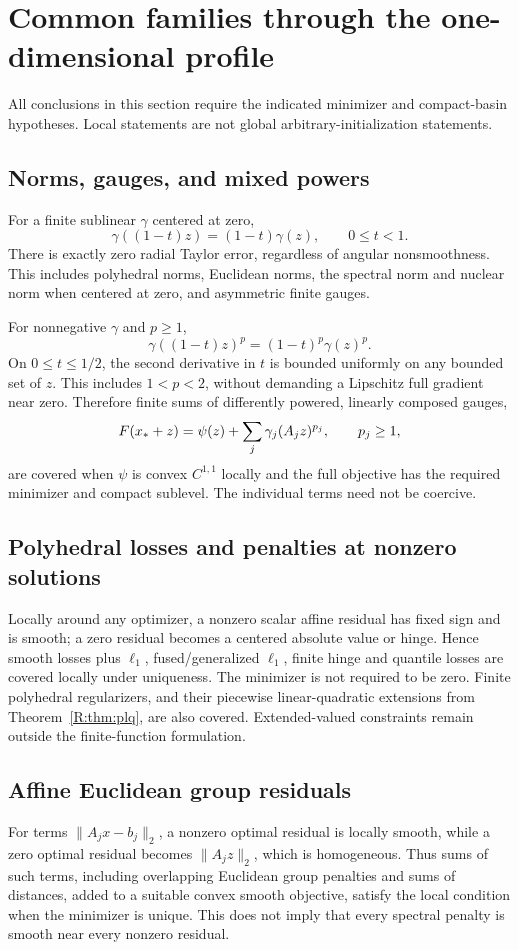 \documentclass[10pt,oneside,openany]{book}
\theoremstyle{remark}\newtheorem{remark}{Remark}[chapter]
\begin{document}
\setcounter{section}{5}
\setcounter{theorem}{0}
\setcounter{equation}{8}
\section{Common families through the one-dimensional profile}
All conclusions in this section require the indicated minimizer and compact-basin hypotheses. Local statements are not global arbitrary-initialization statements.

\subsection{Norms, gauges, and mixed powers}
For a finite sublinear $\gamma$ centered at zero,
\[
 \gamma((1-t)z)=(1-t)\gamma(z),\qquad 0\le t<1.
\]
There is exactly zero radial Taylor error, regardless of angular nonsmoothness. This includes polyhedral norms, Euclidean norms, the spectral norm and nuclear norm when centered at zero, and asymmetric finite gauges.

For nonnegative $\gamma$ and $p\ge1$,
\[
 \gamma((1-t)z)^p=(1-t)^p\gamma(z)^p.
\]
On $0\le t\le1/2$, the second derivative in $t$ is bounded uniformly on any bounded set of $z$. This includes $1<p<2$, without demanding a Lipschitz full gradient near zero. Therefore finite sums of differently powered, linearly composed gauges,
\[
 F(x_*+z)=\psi(z)+\sum_j\gamma_j(A_jz)^{p_j},\qquad p_j\ge1,
\]
are covered when $\psi$ is convex $C^{1,1}$ locally and the full objective has the required minimizer and compact sublevel. The individual terms need not be coercive.

\subsection{Polyhedral losses and penalties at nonzero solutions}
Locally around any optimizer, a nonzero scalar affine residual has fixed sign and is smooth; a zero residual becomes a centered absolute value or hinge. Hence smooth losses plus $\ell_1$, fused/generalized $\ell_1$, finite hinge and quantile losses are covered locally under uniqueness. The minimizer is not required to be zero. Finite polyhedral regularizers, and their piecewise linear-quadratic extensions from Theorem~\ref{R:thm:plq}, are also covered. Extended-valued constraints remain outside the finite-function formulation.

\subsection{Affine Euclidean group residuals}
For terms $\|A_jx-b_j\|_2$, a nonzero optimal residual is locally smooth, while a zero optimal residual becomes $\|A_jz\|_2$, which is homogeneous. Thus sums of such terms, including overlapping Euclidean group penalties and sums of distances, added to a suitable convex smooth objective, satisfy the local condition when the minimizer is unique. This does not imply that every spectral penalty is smooth near every nonzero residual.
\end{document}
